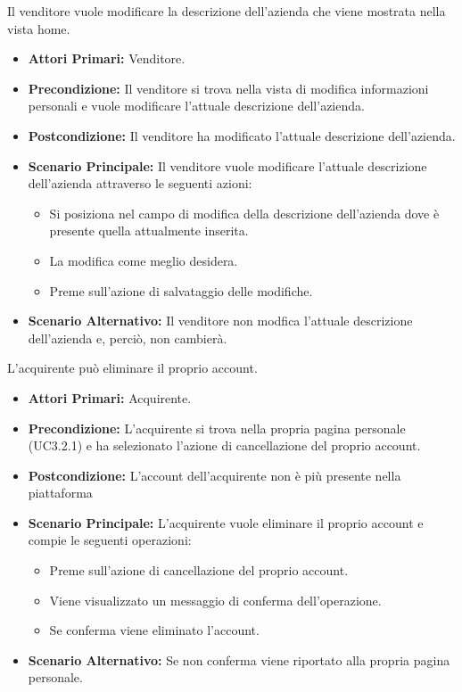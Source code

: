 Il venditore vuole modificare la descrizione dell'azienda che viene mostrata nella vista home.
\begin{itemize}
    \item \textbf{Attori Primari:} Venditore.
    \item \textbf{Precondizione:} Il venditore si trova nella vista di modifica informazioni personali e vuole modificare l'attuale descrizione dell'azienda.
    \item \textbf{Postcondizione:} Il venditore ha modificato l'attuale descrizione dell'azienda.
    \item \textbf{Scenario Principale:} Il venditore vuole modificare l'attuale descrizione dell'azienda attraverso le seguenti azioni:
    \begin{itemize}
        \item Si posiziona nel campo di modifica della descrizione dell'azienda dove è presente quella attualmente inserita.
        \item La modifica come meglio desidera.
        \item Preme sull'azione di salvataggio delle modifiche.
    \end{itemize}
    \item \textbf{Scenario Alternativo:} Il venditore non modfica l'attuale descrizione dell'azienda e, perciò, non cambierà.
\end{itemize}



L'acquirente può eliminare il proprio account.
\begin{itemize}
    \item \textbf{Attori Primari:} Acquirente.
    \item \textbf{Precondizione:} L'acquirente si trova nella propria pagina personale (UC3.2.1) e ha selezionato l'azione di cancellazione del proprio account. 
    \item \textbf{Postcondizione:} L'account dell'acquirente non è più presente nella piattaforma
    \item \textbf{Scenario Principale:} L'acquirente vuole eliminare il proprio account e compie le seguenti operazioni:
    \begin{itemize}
        \item Preme sull'azione di cancellazione del proprio account.
        \item Viene visualizzato un messaggio di conferma dell'operazione.
        \item Se conferma viene eliminato l'account.
    \end{itemize}
    \item \textbf{Scenario Alternativo:} Se non conferma viene riportato alla propria pagina personale.
\end{itemize}

